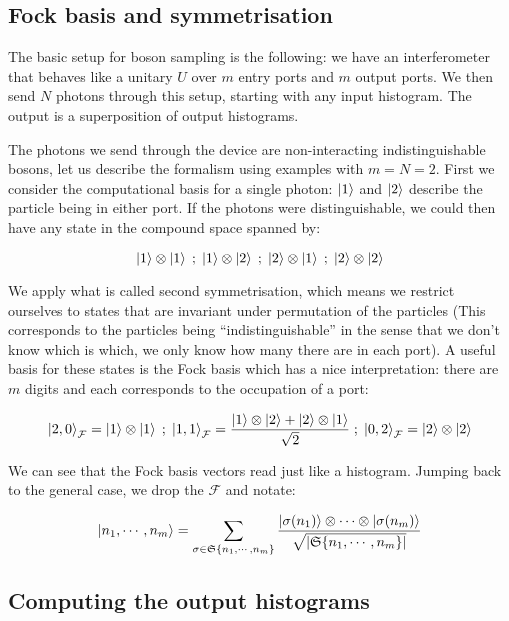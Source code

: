 
\subsection{Fock basis and symmetrisation}

The basic setup for boson sampling is the following: we have an interferometer that behaves like a unitary $U$ over $m$ entry ports and $m$ output ports. We then send $N$ photons through this setup, starting with any input histogram. The output is a superposition of output histograms.

The photons we send through the device are non-interacting indistinguishable bosons, let us describe the formalism using examples with $m=N=2$. First we consider the computational basis for a single photon: $\ket{1}$ and $\ket{2}$ describe the particle being in either port. If the photons were distinguishable, we could then have any state in the compound space spanned by:

\[\ket{1} \otimes \ket{1} \;  ; \; \ket{1} \otimes \ket{2} \; ; \; \ket{2} \otimes \ket{1}  \; ; \; \ket{2} \otimes \ket{2}\]

We apply what is called second symmetrisation, which means we restrict ourselves to states that are invariant under permutation of the particles (This corresponds to the particles being ``indistinguishable'' in the sense that we don't know which is which, we only know how many there are in each port). A useful basis for these states is the Fock basis which has a nice interpretation: there are $m$ digits and each corresponds to the occupation of a port:

\[\ket{2,0}_{\mathcal{F}} = \ket{1} \otimes \ket{1} \; ; \; \ket{1,1}_{\mathcal{F}} = \frac{\ket{1} \otimes \ket{2} + \ket{2} \otimes \ket{1}}{\sqrt{2}} \; ; \; \ket{0,2}_{\mathcal{F}} =  \ket{2} \otimes \ket{2}\]

We can see that the Fock basis vectors read just like a histogram. Jumping back to the general case, we drop the $\mathcal{F}$ and notate:

\[\ket{n_{1},\cdots,n_{m}} = \sum_{\sigma \in \mathfrak{S}\{n_{1},\cdots,n_{m}\}} \frac{\ket{\sigma(n_1)} \otimes \cdots \otimes \ket{\sigma(n_m)}}{\sqrt{| \mathfrak{S}\{n_{1},\cdots,n_{m}\}|}}\]

\subsection{Computing the output histograms}

